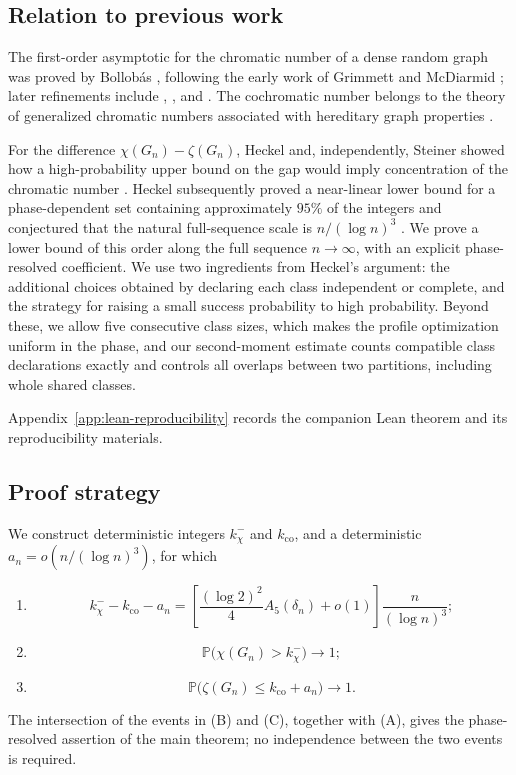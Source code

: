 \documentclass[a4paper,10pt,reqno]{amsart}
\numberwithin{equation}{section}
\theoremstyle{plain}
\theoremstyle{remark}
\begin{document}
\subsection*{Relation to previous work}

The first-order asymptotic for the chromatic number of a dense random graph was
proved by Bollob\'as \citep{bollobas-1988}, following the early work of
Grimmett and McDiarmid \citep{grimmett-mcdiarmid-1975}; later refinements
include \citet{mcdiarmid-1990}, \citet{panagiotou-steger-2009}, and
\citet{heckel-2018}. The cochromatic number belongs to the theory of generalized
chromatic numbers associated with hereditary graph properties
\citep{scheinerman-1992,bollobas-thomason-1995}.

For the difference $\chi(G_n)-\zeta(G_n)$, Heckel and, independently,
Steiner showed how a high-probability upper bound on the gap would imply
concentration of the chromatic number
\citep{heckel-2024-question,steiner-2024}. Heckel subsequently proved a
near-linear lower bound for a phase-dependent set containing approximately
$95\%$ of the integers and conjectured that the natural full-sequence scale is
$n/(\log n)^3$ \citep{heckel-2025-difference}.  We prove a lower bound of
this order along the full sequence $n\to\infty$, with an explicit
phase-resolved coefficient.
We use two ingredients from Heckel's argument: the additional choices
obtained by declaring each class independent or complete, and the strategy
for raising a small success probability to high probability. Beyond these,
we allow five consecutive class sizes, which makes the profile optimization
uniform in the phase, and our second-moment estimate counts compatible class
declarations exactly and controls all overlaps between two partitions,
including whole shared classes.

Appendix~\ref{app:lean-reproducibility} records the companion Lean theorem and its reproducibility materials.

\subsection*{Proof strategy}

We construct deterministic integers $k_\chi^-$ and $k_{\mathrm{co}}$, and a
deterministic $a_n=o(n/(\log n)^3)$, for which
\begin{enumerate}[label=(\Alph*)]
\item
\[
  k_\chi^- - k_{\mathrm{co}}-a_n
  =\left[\frac{(\log 2)^2}{4}A_5(\delta_n)+o(1)\right]
    \frac{n}{(\log n)^3};
\]
\item
\[
  \mathbb P\bigl(\chi(G_n)>k_\chi^-\bigr)\longrightarrow1;
\]
\item
\[
  \mathbb P\bigl(\zeta(G_n)\le k_{\mathrm{co}}+a_n\bigr)
  \longrightarrow1.
\]
\end{enumerate}
The intersection of the events in (B) and (C), together with (A), gives the
phase-resolved assertion of the main theorem; no independence between the two
events is required.
\end{document}
